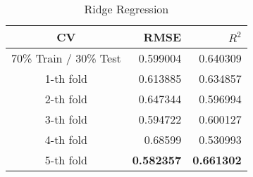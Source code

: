 \begin{table}
\centering
  \caption{Ridge Regression}
  \begin{tabular}{crr}
    \toprule
    {CV} & {RMSE} & {$R^2$} \\\hline
    70\% Train / 30\% Test & 0.599004 & 0.640309 \\
    1-th fold & 0.613885 & 0.634857 \\
    2-th fold & 0.647344 & 0.596994 \\
    3-th fold & 0.594722 & 0.600127 \\
    4-th fold & 0.68599 & 0.530993 \\
    5-th fold & \textbf{0.582357} & \textbf{0.661302} \\\bottomrule
  \end{tabular}
\end{table}

